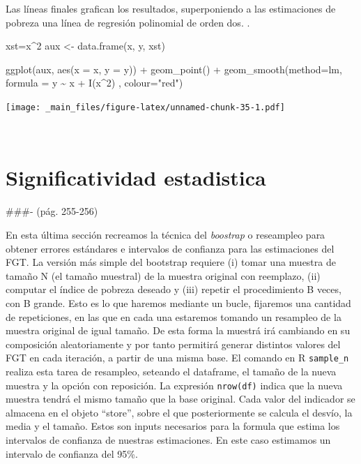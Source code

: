 \documentclass[
]{book}
\newenvironment{Shaded}{\begin{snugshade}}{\end{snugshade}}
\newcommand{\AttributeTok}[1]{\textcolor[rgb]{0.77,0.63,0.00}{#1}}
\newcommand{\DecValTok}[1]{\textcolor[rgb]{0.00,0.00,0.81}{#1}}
\newcommand{\FunctionTok}[1]{\textcolor[rgb]{0.00,0.00,0.00}{#1}}
\newcommand{\NormalTok}[1]{#1}
\newcommand{\OtherTok}[1]{\textcolor[rgb]{0.56,0.35,0.01}{#1}}
\newcommand{\SpecialCharTok}[1]{\textcolor[rgb]{0.00,0.00,0.00}{#1}}
\newcommand{\StringTok}[1]{\textcolor[rgb]{0.31,0.60,0.02}{#1}}
\begin{document}
Las líneas finales grafican los resultados, superponiendo a las estimaciones de pobreza una línea de regresión polinomial de orden dos.
.

\begin{Shaded}
\begin{Highlighting}[]
\NormalTok{xst}\OtherTok{=}\NormalTok{x}\SpecialCharTok{\^{}}\DecValTok{2}
\NormalTok{aux }\OtherTok{\textless{}{-}} \FunctionTok{data.frame}\NormalTok{(x, y, xst)}

\FunctionTok{ggplot}\NormalTok{(aux, }\FunctionTok{aes}\NormalTok{(}\AttributeTok{x =}\NormalTok{ x, }\AttributeTok{y =}\NormalTok{ y)) }\SpecialCharTok{+} 
  \FunctionTok{geom\_point}\NormalTok{() }\SpecialCharTok{+} 
\FunctionTok{geom\_smooth}\NormalTok{(}\AttributeTok{method=}\NormalTok{lm, }\AttributeTok{formula =}\NormalTok{ y }\SpecialCharTok{\textasciitilde{}}\NormalTok{ x }\SpecialCharTok{+} \FunctionTok{I}\NormalTok{(x}\SpecialCharTok{\^{}}\DecValTok{2}\NormalTok{) , }\AttributeTok{colour=}\StringTok{"red"}\NormalTok{)}
\end{Highlighting}
\end{Shaded}

\texttt{[image: \_main\_files/figure-latex/unnamed-chunk-35-1.pdf]}

~

\hypertarget{significatividad-estadistica}{%
\section{Significatividad estadistica}\label{significatividad-estadistica}}

\#\#\#- (pág. 255-256)

En esta última sección recreamos la técnica del \emph{boostrap} o reseampleo para obtener errores estándares e intervalos de confianza para las estimaciones del FGT. La versión más simple del bootstrap requiere (i) tomar una muestra de tamaño N (el tamaño muestral) de la muestra original con reemplazo, (ii) computar el índice de pobreza deseado y (iii) repetir el procedimiento B veces, con B grande. Esto es lo que haremos mediante un bucle, fijaremos una cantidad de repeticiones, en las que en cada una estaremos tomando un resampleo de la muestra original de igual tamaño. De esta forma la muestrá irá cambiando en su composición aleatoriamente y por tanto permitirá generar distintos valores del FGT en cada iteración, a partir de una misma base. El comando en R \texttt{sample\_n} realiza esta tarea de resampleo, seteando el dataframe, el tamaño de la nueva muestra y la opción con reposición. La expresión \texttt{nrow(df)} indica que la nueva muestra tendrá el mismo tamaño que la base original. Cada valor del indicador se almacena en el objeto ``store'', sobre el que posteriormente se calcula el desvío, la media y el tamaño. Estos son inputs necesarios para la formula que estima los intervalos de confianza de nuestras estimaciones. En este caso estimamos un intervalo de confianza del 95\%.
\end{document}
